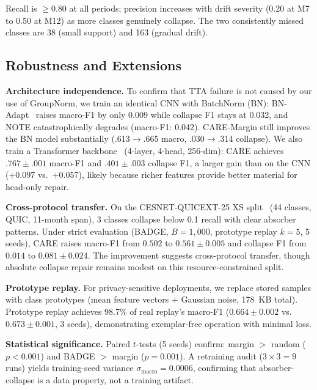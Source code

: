 \documentclass[journal]{IEEEtran}
\newcommand{\ours}{CARE}  %
\begin{document}
Recall is $\geq$0.80 at all periods; precision increases with drift severity (0.20 at M7 to 0.50 at M12) as more classes genuinely collapse.
The two consistently missed classes are 38 (small support) and 163 (gradual drift).

\subsection{Robustness and Extensions}
\label{sec:robustness}

\textbf{Architecture independence.}
\label{sec:bn_verify}
\label{sec:transformer}
To confirm that TTA failure is not caused by our use of GroupNorm, we train an identical CNN with BatchNorm (BN): BN-Adapt~\cite{schneider2020bn} raises macro-F1 by only 0.009 while collapse F1 stays at 0.032, and NOTE catastrophically degrades (macro-F1: 0.042). \ours{}-Margin still improves the BN model substantially (.613$\to$.665 macro, .030$\to$.314 collapse).
We also train a Transformer backbone~\cite{vaswani2017attention} (4-layer, 4-head, 256-dim): \ours{} achieves $.767{\pm}.001$ macro-F1 and $.401{\pm}.003$ collapse F1, a larger gain than on the CNN (+0.097 vs.\ +0.057), likely because richer features provide better material for head-only repair.

\textbf{Cross-protocol transfer.}
\label{sec:quicext25}
On the CESNET-QUICEXT-25 XS split~\cite{cesnetquicext25} (44 classes, QUIC, 11-month span), 3 classes collapse below 0.1 recall with clear absorber patterns.
Under strict evaluation (BADGE, $B{=}1{,}000$, prototype replay $k{=}5$, 5 seeds), \ours{} raises macro-F1 from $0.502$ to $0.561{\pm}0.005$ and collapse F1 from $0.014$ to $0.081{\pm}0.024$.
The improvement suggests cross-protocol transfer, though absolute collapse repair remains modest on this resource-constrained split.

\textbf{Prototype replay.}
\label{sec:proto_replay}
For privacy-sensitive deployments, we replace stored samples with class prototypes (mean feature vectors + Gaussian noise, 178~KB total).
Prototype replay achieves 98.7\% of real replay's macro-F1 ($0.664{\pm}0.002$ vs.\ $0.673{\pm}0.001$, 3 seeds), demonstrating exemplar-free operation with minimal loss.

\textbf{Statistical significance.}
\label{sec:significance}
Paired $t$-tests (5 seeds) confirm: margin $>$ random ($p{<}0.001$) and BADGE $>$ margin ($p{=}0.001$).
A retraining audit ($3{\times}3{=}9$ runs) yields training-seed variance $\sigma_{\text{macro}}{=}0.0006$, confirming that absorber-collapse is a data property, not a training artifact.
\end{document}
